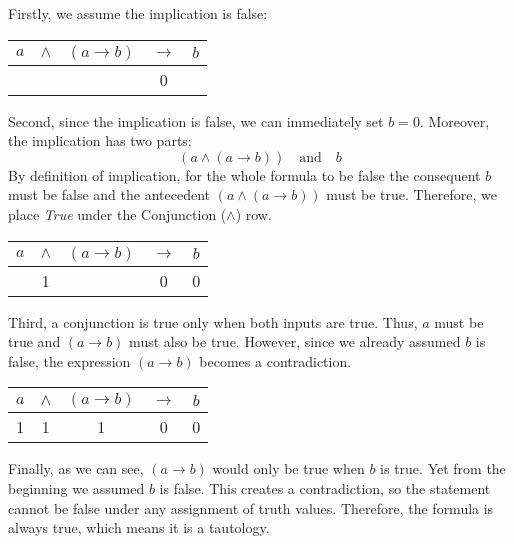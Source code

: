 \documentclass[12pt,a4paper,openany]{article}
\begin{document}
Firstly, we assume the implication is false:

\begin{center}
\begin{tabular}{|c|c|c|c|c|}
\hline
$a$ & $\land$ & $(a \rightarrow b)$ & $\rightarrow$ & $b$ \\
\hline
 & & & \textcolor{falsecolor}{0} & \\
\hline
\end{tabular}
\end{center}

Second, since the implication is false, we can immediately set $b = 0$. Moreover, the implication has two parts:
$$ (a \land (a \rightarrow b)) \quad \text{and} \quad b $$
By definition of implication, for the whole formula to be false the consequent $b$ must be false and the antecedent $(a \land (a \rightarrow b))$ must be true. Therefore, we place \textit{True} under the Conjunction ($\land$) row.

\begin{center}
\begin{tabular}{|c|c|c|c|c|}
\hline
$a$ & $\land$ & $(a \rightarrow b)$ & $\rightarrow$ & $b$ \\
\hline
 & \textcolor{truecolor}{1} & & \textcolor{falsecolor}{0} & \textcolor{falsecolor}{0} \\
\hline
\end{tabular}
\end{center}

Third, a conjunction is true only when both inputs are true. Thus, $a$ must be true and $(a \rightarrow b)$ must also be true. 
However, since we already assumed $b$ is false, the expression $(a \rightarrow b)$ becomes a contradiction.

\begin{center}
\begin{tabular}{|c|c|c|c|c|}
\hline
$a$ & $\land$ & $(a \rightarrow b)$ & $\rightarrow$ & $b$ \\
\hline
\textcolor{truecolor}{1} & \textcolor{truecolor}{1} & \textcolor{truecolor}{1} & \textcolor{falsecolor}{0} & \textcolor{falsecolor}{0} \\
\hline
\end{tabular}
\end{center}

Finally, as we can see, $(a \rightarrow b)$ would only be true when $b$ is true. Yet from the beginning we assumed $b$ is false. This creates a contradiction,
so the statement cannot be false under any assignment of truth values. Therefore, the formula is always true, which means it is a tautology.
\end{document}
